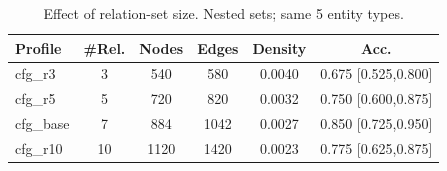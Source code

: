 \begin{table}[t]
\centering
\caption{Effect of relation-set size. Nested sets; same 5 entity types.}
\label{tab:schema}
\begin{tabular}{lccccc}
\toprule
Profile & \#Rel. & Nodes & Edges & Density & Acc. \\
\midrule
cfg_r3 & 3 & 540 & 580 & 0.0040 & 0.675 [0.525,0.800] \\
cfg_r5 & 5 & 720 & 820 & 0.0032 & 0.750 [0.600,0.875] \\
cfg_base & 7 & 884 & 1042 & 0.0027 & 0.850 [0.725,0.950] \\
cfg_r10 & 10 & 1120 & 1420 & 0.0023 & 0.775 [0.625,0.875] \\
\bottomrule
\end{tabular}
\end{table}